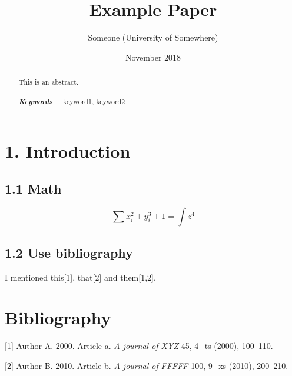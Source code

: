 \documentclass[a4paperpaper,twocolumns]{article}
\title{Example Paper}
\author{Someone (University of Somewhere)}
\date{November 2018}
\begin{document}
\maketitle

\providecommand{\keywords}[1]
{
  \small
  \textbf{\textit{Keywords---}} #1
}

\hspace{5pt}
\begin{abstract}
This is an abstract.
\\ \\
\keywords{keyword1, keyword2}
\end{abstract} \hspace{5pt}

\hypertarget{introduction}{%
\section{1. Introduction}\label{introduction}}

\hypertarget{math}{%
\subsection{1.1 Math}\label{math}}

\[
    \sum{x_i^2 + y_i^3 + 1} = \int{z^4}
\]

\hypertarget{use-bibliography}{%
\subsection{1.2 Use bibliography}\label{use-bibliography}}

I mentioned this{[}1{]}, that{[}2{]} and them{[}1,2{]}.

\hypertarget{bibliography}{%
\section*{Bibliography}\label{bibliography}}

\hypertarget{refs}{}
\leavevmode\hypertarget{ref-bib1}{}%
{[}1{]} Author A. 2000. Article a. \emph{A journal of XYZ} 45, 4\_ts
(2000), 100--110.

\leavevmode\hypertarget{ref-bib2}{}%
{[}2{]} Author B. 2010. Article b. \emph{A journal of FFFFF} 100, 9\_xs
(2010), 200--210.
\end{document}
